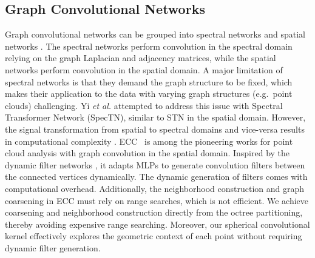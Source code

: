 \documentclass[10pt,twocolumn,letterpaper]{article}
\begin{document}
\subsection{Graph Convolutional Networks}
\vspace{-2mm}
Graph convolutional networks can be grouped into spectral networks \cite{bruna2013spectral,defferrard2016convolutional,kipf2017semi} and spatial networks \cite{simonovsky2017dynamic}. The spectral networks perform convolution in the spectral domain relying on the graph Laplacian and adjacency matrices, while the spatial networks perform convolution in the spatial domain. 
A major limitation of spectral networks is that they demand the graph structure to be fixed, which makes their application to the data with varying graph structures (e.g.~point clouds) challenging. Yi \emph{et al.} \cite{yi2017syncspeccnn} attempted to address this issue with Spectral Transformer Network (SpecTN), similar to STN \cite{jaderberg2015spatial} in the spatial domain. However, the signal transformation from spatial to spectral domains and vice-versa results in  computational complexity . 
ECC~\cite{simonovsky2017dynamic} is among the pioneering works  for point cloud analysis with graph convolution in the spatial domain. Inspired by the dynamic filter networks \cite{de2016dynamic}, it adapts MLPs to generate convolution filters between the connected vertices dynamically. 
 The dynamic generation of filters comes with computational overhead. Additionally, the neighborhood construction and graph coarsening in ECC must rely on range searches, which is not efficient. We achieve  
coarsening and neighborhood construction directly from the  octree partitioning, thereby avoiding expensive range searching. Moreover, our spherical convolutional kernel effectively explores the geometric context of each point without requiring dynamic filter generation.


\vspace{-1mm}
\end{document}
